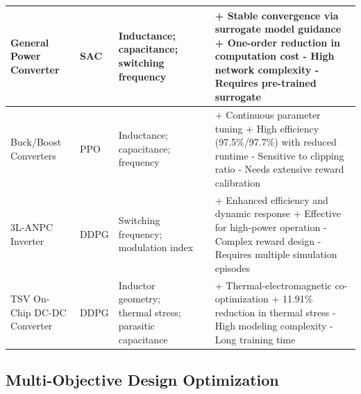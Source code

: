 \begin{table}[!t]
{\begin{tabular}{@{} p{2.2cm} l p{2.5cm} l p{7cm}@{}}
General Power \newline Converter & SAC &
Inductance;\newline
 capacitance;\newline
 switching frequency &
\cite{bui2022deep} &
+ Stable convergence via surrogate model guidance \newline
+ One-order reduction in computation cost \newline
- High network complexity \newline
- Requires pre-trained surrogate \\ 
\midrule

Buck/Boost Converters & PPO &
Inductance;\newline
capacitance;\newline
 frequency &
\cite{bui2023deep} &
+ Continuous parameter tuning \newline
+ High efficiency (97.5\%/97.7\%) with reduced runtime \newline
- Sensitive to clipping ratio \newline
- Needs extensive reward calibration \\ 
\midrule

3L-ANPC Inverter & DDPG &
Switching frequency;\newline
modulation index &
\cite{wang2022efficiency} &
+ Enhanced efficiency and dynamic response \newline
+ Effective for high-power operation \newline
- Complex reward design \newline
- Requires multiple simulation episodes \\ 
\midrule

TSV On-Chip DC-DC Converter & DDPG &
Inductor geometry; \newline
thermal stress; \newline
parasitic capacitance &
\cite{wang2023modeling} &
+ Thermal-electromagnetic co-optimization \newline
+ 11.91\% reduction in thermal stress \newline
- High modeling complexity \newline
- Long training time \\ 
\bottomrule
\end{tabular}}
\end{table}


\subsection{Multi-Objective Design Optimization}
\label{sec:multi-objective-optimization}

